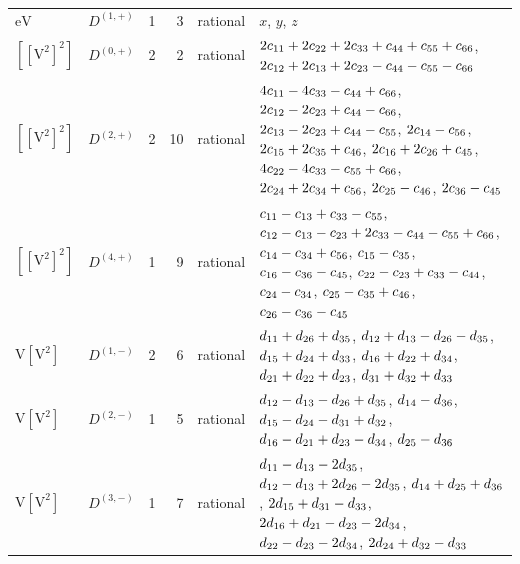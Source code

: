 \documentclass[10pt,a4paper]{article}
\numberwithin{equation}{section}
\newcommand{\irrJp}[2]{D^{(#1,#2)}}
\newcommand{\jahn}[1]{\mathrm{#1}}
\newlength{\fillwidth}\newlength{\cellwidth}\newlength{\colwidth}
\newcommand{\signbreak}{\penalty100\relax}
\begin{document}
{\begin{longtable}{@{}llrrl>{\RaggedRight\arraybackslash}p{\fillwidth}@{}}
$\jahn{eV}$ & $\irrJp{1}{+}$ & 1 & 3 & rational & $x$, $y$, $z$\\
$\jahn{[[V^{2}]^{2}]}$ & $\irrJp{0}{+}$ & 2 & 2 & rational & $2c_{11} +\signbreak 2c_{22} +\signbreak 2c_{33} +\signbreak c_{44} +\signbreak c_{55} +\signbreak c_{66}$, $2c_{12} +\signbreak 2c_{13} +\signbreak 2c_{23} -\signbreak c_{44} -\signbreak c_{55} -\signbreak c_{66}$\\
$\jahn{[[V^{2}]^{2}]}$ & $\irrJp{2}{+}$ & 2 & 10 & rational & $4c_{11} -\signbreak 4c_{33} -\signbreak c_{44} +\signbreak c_{66}$, $2c_{12} -\signbreak 2c_{23} +\signbreak c_{44} -\signbreak c_{66}$, $2c_{13} -\signbreak 2c_{23} +\signbreak c_{44} -\signbreak c_{55}$, $2c_{14} -\signbreak c_{56}$, $2c_{15} +\signbreak 2c_{35} +\signbreak c_{46}$, $2c_{16} +\signbreak 2c_{26} +\signbreak c_{45}$, $4c_{22} -\signbreak 4c_{33} -\signbreak c_{55} +\signbreak c_{66}$, $2c_{24} +\signbreak 2c_{34} +\signbreak c_{56}$, $2c_{25} -\signbreak c_{46}$, $2c_{36} -\signbreak c_{45}$\\
$\jahn{[[V^{2}]^{2}]}$ & $\irrJp{4}{+}$ & 1 & 9 & rational & $c_{11} -\signbreak c_{13} +\signbreak c_{33} -\signbreak c_{55}$, $c_{12} -\signbreak c_{13} -\signbreak c_{23} +\signbreak 2c_{33} -\signbreak c_{44} -\signbreak c_{55} +\signbreak c_{66}$, $c_{14} -\signbreak c_{34} +\signbreak c_{56}$, $c_{15} -\signbreak c_{35}$, $c_{16} -\signbreak c_{36} -\signbreak c_{45}$, $c_{22} -\signbreak c_{23} +\signbreak c_{33} -\signbreak c_{44}$, $c_{24} -\signbreak c_{34}$, $c_{25} -\signbreak c_{35} +\signbreak c_{46}$, $c_{26} -\signbreak c_{36} -\signbreak c_{45}$\\
$\jahn{V[V^{2}]}$ & $\irrJp{1}{-}$ & 2 & 6 & rational & $d_{11} +\signbreak d_{26} +\signbreak d_{35}$, $d_{12} +\signbreak d_{13} -\signbreak d_{26} -\signbreak d_{35}$, $d_{15} +\signbreak d_{24} +\signbreak d_{33}$, $d_{16} +\signbreak d_{22} +\signbreak d_{34}$, $d_{21} +\signbreak d_{22} +\signbreak d_{23}$, $d_{31} +\signbreak d_{32} +\signbreak d_{33}$\\
$\jahn{V[V^{2}]}$ & $\irrJp{2}{-}$ & 1 & 5 & rational & $d_{12} -\signbreak d_{13} -\signbreak d_{26} +\signbreak d_{35}$, $d_{14} -\signbreak d_{36}$, $d_{15} -\signbreak d_{24} -\signbreak d_{31} +\signbreak d_{32}$, $d_{16} -\signbreak d_{21} +\signbreak d_{23} -\signbreak d_{34}$, $d_{25} -\signbreak d_{36}$\\
$\jahn{V[V^{2}]}$ & $\irrJp{3}{-}$ & 1 & 7 & rational & $d_{11} -\signbreak d_{13} -\signbreak 2d_{35}$, $d_{12} -\signbreak d_{13} +\signbreak 2d_{26} -\signbreak 2d_{35}$, $d_{14} +\signbreak d_{25} +\signbreak d_{36}$, $2d_{15} +\signbreak d_{31} -\signbreak d_{33}$, $2d_{16} +\signbreak d_{21} -\signbreak d_{23} -\signbreak 2d_{34}$, $d_{22} -\signbreak d_{23} -\signbreak 2d_{34}$, $2d_{24} +\signbreak d_{32} -\signbreak d_{33}$\\

\end{longtable}}
\end{document}
